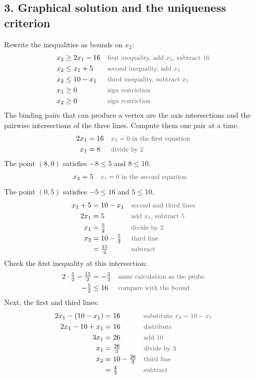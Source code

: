 \documentclass[a4paper,11pt]{article}
\newcommand{\teil}[1]{\subsection*{#1}}
\newcommand{\why}[1]{\text{\small\color{black!65}#1}}
\begin{document}
\teil{3. Graphical solution and the uniqueness criterion}
Rewrite the inequalities as bounds on $x_2$:
\begin{align*}
x_2&\geq 2x_1-16&&\why{first inequality, add $x_2$, subtract $16$}\\
x_2&\leq x_1+5&&\why{second inequality, add $x_1$}\\
x_2&\leq 10-x_1&&\why{third inequality, subtract $x_1$}\\
x_1&\geq 0&&\why{sign restriction}\\
x_2&\geq 0&&\why{sign restriction}
\end{align*}
The binding pairs that can produce a vertex are the axis intersections and the pairwise intersections of the three lines. Compute them one pair at a time.
\begin{align*}
2x_1&=16&&\why{$x_2=0$ in the first equation}\\
x_1&=8&&\why{divide by $2$}
\end{align*}
The point $(8,0)$ satisfies $-8\leq 5$ and $8\leq 10$.
\begin{align*}
x_2&=5&&\why{$x_1=0$ in the second equation}
\end{align*}
The point $(0,5)$ satisfies $-5\leq 16$ and $5\leq 10$.
\begin{align*}
x_1+5&=10-x_1&&\why{second and third lines}\\
2x_1&=5&&\why{add $x_1$, subtract $5$}\\
x_1&=\tfrac52&&\why{divide by $2$}\\
x_2&=10-\tfrac52&&\why{third line}\\
&=\tfrac{15}{2}&&\why{subtract}
\end{align*}
Check the first inequality at this intersection:
\begin{align*}
2\cdot\tfrac52-\tfrac{15}{2}&=-\tfrac52&&\why{same calculation as the probe}\\
-\tfrac52&\leq 16&&\why{compare with the bound}
\end{align*}
Next, the first and third lines:
\begin{align*}
2x_1-(10-x_1)&=16&&\why{substitute $x_2=10-x_1$}\\
2x_1-10+x_1&=16&&\why{distribute}\\
3x_1&=26&&\why{add $10$}\\
x_1&=\tfrac{26}{3}&&\why{divide by $3$}\\
x_2&=10-\tfrac{26}{3}&&\why{third line}\\
&=\tfrac43&&\why{subtract}
\end{align*}
\end{document}

